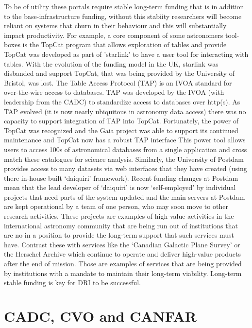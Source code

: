 \documentclass[11pt]{article}
\begin{document}
To be of utility these portals require stable long-term funding that is in addition to the base-infrastructure funding, without this stabiity researchers will become reliant on systems that churn in their behaviour and this will substantially impact productivity.  
For example, a core component of some astronomers tool-boxes is the TopCat program that allows exploration of tables and provide TopCat was developed as part of 'starlink' to have a user tool for interacting with tables.  
With the evolution of the funding model in the UK, starlink was disbanded and support TopCat, that was being provided by the University of Bristol, was lost. 
The Table Access Protocol (TAP) is an IVOA standard for over-the-wire access to databases. 
TAP was developed by the IVOA (with leadership from the CADC) to standardize access to databases over http(s).  
As TAP evolved (it is now nearly ubiquitous in astronomy data access) there was no capacity to support integration of TAP into TopCat.  
Fortunately, the power of TopCat was recognized and the Gaia project was able to support its continued maintenance and TopCat now has a robust TAP interface
This power tool allows users to access 100s of astronomical databases from a single application and cross match these catalogues for science analysis.  
Similarly, the University of Postdam provides access to many datasets via web interfaces that they have created (using there in-house built `daiquiri' framework).  Recent funding changes at Postdam mean that the lead developer of `daiquiri' is now `self-employed' by individual projects that need parts of the system updated and the main servers at Postdam are kept operational by a team of one person, who may soon move to other research activities.  
These projects are examples of high-value activities in the international astronomy community that are being run out of institutions that are no in a position to provide the long-term support that such services must have.  
Contrast these with services like the `Canadian Galactic Plane Survey' or the Herschel Archive which continue to operate and deliver high-value products after the end of mission.  Those are examples of services that are being provided by institutions with a mandate to maintain their long-term viability. 
Long-term stable funding is key for DRI to be successful.


\section{CADC, CVO and CANFAR}
\end{document}
